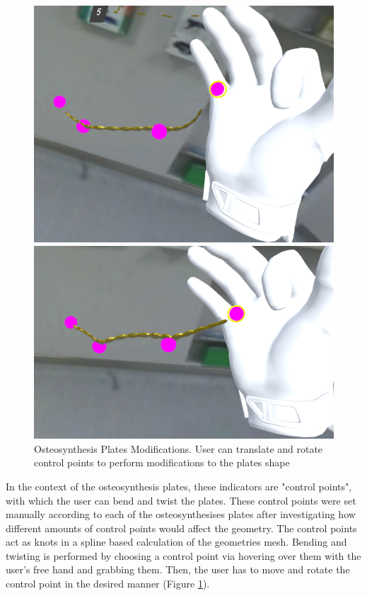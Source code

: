 \begin{figure}
  \centering
  \begin{minipage}{.5\textwidth}
    \centering
    \includegraphics[width=0.95\linewidth]{images/implementation/features/procedures/metal_plates_2.png}
  \end{minipage}%
  \begin{minipage}{.5\textwidth}
    \centering
    \includegraphics[width=0.95\linewidth]{images/implementation/features/procedures/metal_plates_3.png}
  \end{minipage}
  \caption{\label{fig::FeatureMetalPlate2}Osteosynthesis Plates Modifications. User can translate and rotate control points to perform modifications to the plates shape} 
\end{figure}

In the context of the osteosynthesis plates, these indicators are "control points", with which the user can bend and twist the plates.
These control points were set manually according to each of the osteosynthesises plates after investigating how different amounts of control points would affect the geometry.
The control points act as knots in a spline based calculation of the geometries mesh.
Bending and twisting is performed by choosing a control point via hovering over them with the user's free hand and grabbing them.
Then, the user has to move and rotate the control point in the desired manner (Figure \ref{fig::FeatureMetalPlate2}).
